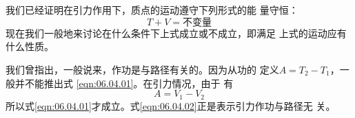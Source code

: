 \section[保守力]{}\label{sec:06.04}

我们已经证明在引力作用下，质点的运动遵守下列形式的能
量守恒：
\begin{equation}\label{eqn:06.04.01}
  T + V = \text{不变量}
\end{equation}
现在我们一般地来讨论在什么条件下上式成立或不成立，即满足
上式的运动应有什么性质。

我们曾指出，一般说来，作功是与路径有关的。因为从功的
定义$ A = T _ { 2 } - T _ { 1 } $，一般并不能推出式 \eqref{eqn:06.04.01}。在引力情况，由于
有
\begin{equation}\label{eqn:06.04.02}
  A = V _ { 1 } - V _ { 2 }
\end{equation}
所以式\eqref{eqn:06.04.01}才成立。式\eqref{eqn:06.04.02}正是表示引力作功与路径无
关。


